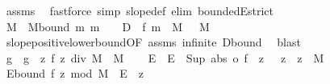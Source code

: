 \begin{isabellebody}
\ assms\ \isamarkupfalse%
\ {\isacharparenleft}{\kern0pt}fastforce\ simp{\isacharcolon}{\kern0pt}\ slope{\isacharunderscore}{\kern0pt}def\ elim{\isacharcolon}{\kern0pt}\ boundedE{\isacharunderscore}{\kern0pt}strict{\isacharparenright}{\kern0pt}\isanewline
\ \isanewline
\ \ \isamarkupfalse%
\ M\ \ M{\isacharunderscore}{\kern0pt}bound{\isacharcolon}{\kern0pt}\ {\isachardoublequoteopen}{\isasymforall}m{\isachargreater}{\kern0pt}{}{\isachardot}{\kern0pt}\ {\isacharparenleft}{\kern0pt}m\ {\isacharplus}{\kern0pt}\ {}{\isacharparenright}{\kern0pt}\ {\isacharasterisk}{\kern0pt}\ D\ {\isasymle}\ f\ {\isacharparenleft}{\kern0pt}m\ {\isacharasterisk}{\kern0pt}\ M{\isacharparenright}{\kern0pt}{\isachardoublequoteclose}\ {\isachardoublequoteopen}{}\ {\isacharless}{\kern0pt}\ M{\isachardoublequoteclose}\ \isamarkupfalse%
\ slope{\isacharunderscore}{\kern0pt}positive{\isacharunderscore}{\kern0pt}lower{\isacharunderscore}{\kern0pt}bound{\isacharbrackleft}{\kern0pt}OF\ assms\ infinite{\isacharbrackright}{\kern0pt}\ D{\isacharunderscore}{\kern0pt}bound{\isacharparenleft}{\kern0pt}{}{\isacharparenright}{\kern0pt}\ \isamarkupfalse%
\ blast\isanewline
\isanewline
\ \ \isamarkupfalse%
\ g\ \ {\isachardoublequoteopen}g\ {\isacharequal}{\kern0pt}\ {\isacharparenleft}{\kern0pt}{\isasymlambda}z{\isachardot}{\kern0pt}\ f\ {\isacharparenleft}{\kern0pt}{\isacharparenleft}{\kern0pt}z\ div\ M{\isacharparenright}{\kern0pt}\ {\isacharasterisk}{\kern0pt}\ M{\isacharparenright}{\kern0pt}{\isacharparenright}{\kern0pt}{\isachardoublequoteclose}\isanewline
\ \ \isamarkupfalse%
\ E\ \ {\isachardoublequoteopen}E\ {\isacharequal}{\kern0pt}\ Sup\ {\isacharparenleft}{\kern0pt}{\isacharparenleft}{\kern0pt}abs\ o\ f{\isacharparenright}{\kern0pt}\ {\isacharbackquote}{\kern0pt}\ {\isacharbraceleft}{\kern0pt}z{\isachardot}{\kern0pt}\ {}\ {\isasymle}\ z\ {\isasymand}\ z\ {\isacharless}{\kern0pt}\ M{\isacharbraceright}{\kern0pt}{\isacharparenright}{\kern0pt}{\isachardoublequoteclose}\isanewline
\ \ \isanewline
\ \ \isamarkupfalse%
\ E{\isacharunderscore}{\kern0pt}bound{\isacharcolon}{\kern0pt}\ {\isachardoublequoteopen}{\isasymbar}f\ {\isacharparenleft}{\kern0pt}z\ mod\ M{\isacharparenright}{\kern0pt}{\isasymbar}\ {\isasymle}\ E{\isachardoublequoteclose}\ \ z\isanewline
\ \ \isamarkupfalse%
\ {\isacharminus}{\kern0pt}\isanewline
\ \ \ \ \isamarkupfalse%

\end{isabellebody}

